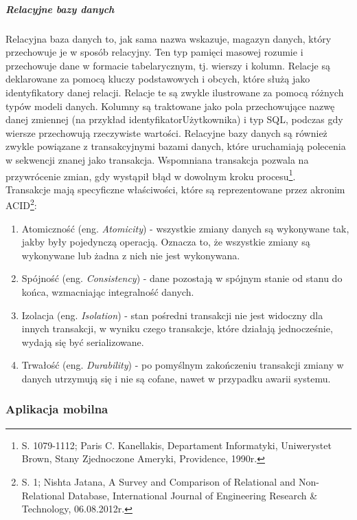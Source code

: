 \documentclass[12pt, a4paper, twoside, openany]{book}
\newcommand{\forceindent}{\leavevmode{\parindent=1.3em\indent}}
\begin{document}
\subparagraph{Relacyjne bazy danych\\}
\forceindent Relacyjna baza danych to, jak sama nazwa wskazuje, magazyn danych, który przechowuje je w sposób relacyjny.
Ten typ pamięci masowej rozumie i przechowuje dane w formacie tabelarycznym, tj. wierszy i kolumn.
Relacje są deklarowane za pomocą kluczy podstawowych i obcych, które służą jako identyfikatory danej relacji.
Relacje te są zwykle ilustrowane za pomocą różnych typów modeli danych.
Kolumny są traktowane jako pola przechowujące nazwę danej zmiennej (na przykład identyfikatorUżytkownika) i typ SQL, podczas gdy wiersze przechowują rzeczywiste wartości.
Relacyjne bazy danych są również zwykle powiązane z transakcyjnymi bazami danych, które uruchamiają polecenia w sekwencji znanej jako transakcja.
Wspomniana transakcja pozwala na przywrócenie zmian, gdy wystąpił błąd w dowolnym kroku procesu\footnote{S. 1079-1112; Paris C. Kanellakis, Departament Informatyki, Uniwerystet Brown, Stany Zjednoczone Ameryki, Providence, 1990r.}.\\
Transakcje mają specyficzne właściwości, które są reprezentowane przez akronim ACID\footnote{S. 1; Nishta Jatana, A Survey and Comparison of Relational and Non-Relational Database, International Journal of Engineering Research \& Technology, 06.08.2012r.}:
\begin{enumerate}[label=--]
    \item Atomiczność (eng. \textit{Atomicity}) - wszystkie zmiany danych są wykonywane tak, jakby były pojedynczą operacją. Oznacza to, że wszystkie zmiany są wykonywane lub żadna z nich nie jest wykonywana.
    \item Spójność (eng. \textit{Consistency}) - dane pozostają w spójnym stanie od stanu do końca, wzmacniając integralność danych.
    \item Izolacja (eng. \textit{Isolation}) - stan pośredni transakcji nie jest widoczny dla innych transakcji, w wyniku czego transakcje, które działają jednocześnie, wydają się być serializowane.
    \item Trwałość (eng. \textit{Durability}) - po pomyślnym zakończeniu transakcji zmiany w danych utrzymują się i nie są cofane, nawet w przypadku awarii systemu.
\end{enumerate}

\subsubsection{Aplikacja mobilna}
\end{document}
